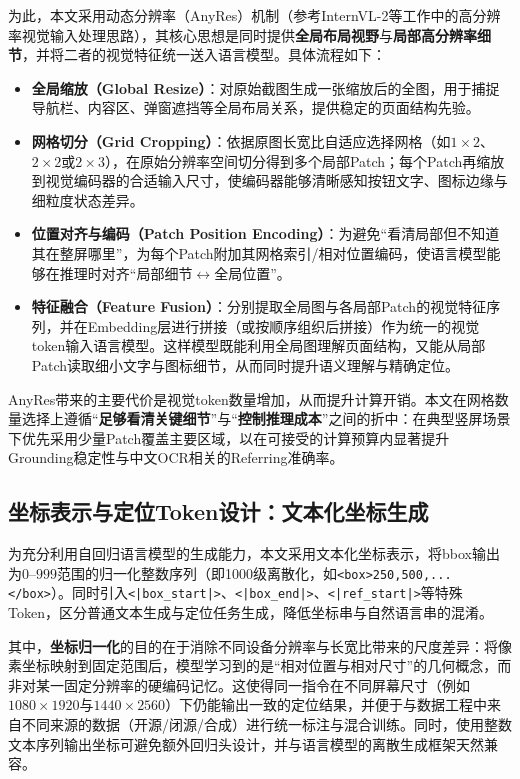 为此，本文采用动态分辨率（AnyRes）机制（参考InternVL-2等工作中的高分辨率视觉输入处理思路\citep{openGVLab2024internvl2}），其核心思想是同时提供\textbf{全局布局视野}与\textbf{局部高分辨率细节}，并将二者的视觉特征统一送入语言模型。具体流程如下：
\begin{itemize}
  \item \textbf{全局缩放（Global Resize）}：对原始截图生成一张缩放后的全图，用于捕捉导航栏、内容区、弹窗遮挡等全局布局关系，提供稳定的页面结构先验。
  \item \textbf{网格切分（Grid Cropping）}：依据原图长宽比自适应选择网格（如$1\times2$、$2\times2$或$2\times3$），在原始分辨率空间切分得到多个局部Patch；每个Patch再缩放到视觉编码器的合适输入尺寸，使编码器能够清晰感知按钮文字、图标边缘与细粒度状态差异。
  \item \textbf{位置对齐与编码（Patch Position Encoding）}：为避免“看清局部但不知道其在整屏哪里”，为每个Patch附加其网格索引/相对位置编码，使语言模型能够在推理时对齐“局部细节$\leftrightarrow$全局位置”。
  \item \textbf{特征融合（Feature Fusion）}：分别提取全局图与各局部Patch的视觉特征序列，并在Embedding层进行拼接（或按顺序组织后拼接）作为统一的视觉token输入语言模型。这样模型既能利用全局图理解页面结构，又能从局部Patch读取细小文字与图标细节，从而同时提升语义理解与精确定位。
\end{itemize}

AnyRes带来的主要代价是视觉token数量增加，从而提升计算开销。本文在网格数量选择上遵循“\textbf{足够看清关键细节}”与“\textbf{控制推理成本}”之间的折中：在典型竖屏场景下优先采用少量Patch覆盖主要区域，以在可接受的计算预算内显著提升Grounding稳定性与中文OCR相关的Referring准确率。

\subsection{坐标表示与定位Token设计：文本化坐标生成}
为充分利用自回归语言模型的生成能力，本文采用文本化坐标表示，将bbox输出为$0\text{--}999$范围的归一化整数序列（即1000级离散化，如\texttt{<box>250,500,\allowbreak ...</box>}）。同时引入\texttt{<|box\_start|>}、\texttt{<|box\_end|>}、\texttt{<|ref\_start|>}等特殊Token，区分普通文本生成与定位任务生成，降低坐标串与自然语言串的混淆。

其中，\textbf{坐标归一化}的目的在于消除不同设备分辨率与长宽比带来的尺度差异：将像素坐标映射到固定范围后，模型学习到的是“相对位置与相对尺寸”的几何概念，而非对某一固定分辨率的硬编码记忆。这使得同一指令在不同屏幕尺寸（例如$1080\times1920$与$1440\times2560$）下仍能输出一致的定位结果，并便于与数据工程中来自不同来源的数据（开源/闭源/合成）进行统一标注与混合训练。同时，使用整数文本序列输出坐标可避免额外回归头设计，并与语言模型的离散生成框架天然兼容。

